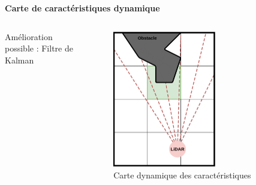 \documentclass[aspectratio=169,10pt]{beamer}
\begin{document}
\begin{frame}{\textbf{Carte de caractéristiques dynamique}}
\begin{columns}
\begin{column}{0.7\textwidth}
			Amélioration possible : Filtre de Kalman
		\end{column}
		\begin{column}{0.3\textwidth}
			\begin{figure}
				\centering
				\includegraphics[width=0.6\textwidth]{IMAGES/lidar_occurance_map.png}
				\caption{Carte dynamique des caractéristiques}
			\end{figure}
		\end{column}
	\end{columns}

\end{frame}
\end{document}
